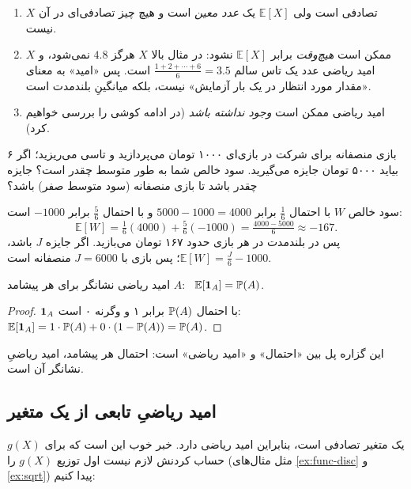 \begin{note}
  \begin{enumerate}
    \item $X$ تصادفی است ولی $\mathbb E[X]$ یک \emph{عدد معین} است و هیچ چیز تصادفی‌ای در آن نیست.
    \item $X$ ممکن است \emph{هیچ‌وقت} برابر $\mathbb E[X]$ نشود: در مثال بالا $X$ هرگز $4.8$ نمی‌شود، و امید ریاضی عدد یک تاس سالم $\frac{1+2+\cdots+6}{6}=3.5$ است. پس «امید» به معنای «مقدار مورد انتظار در یک بار آزمایش» نیست، بلکه میانگینِ بلندمدت است.
    \item امید ریاضی ممکن است \emph{وجود نداشته باشد} (در ادامه کوشی را بررسی خواهیم کرد).
  \end{enumerate}
\end{note}

\begin{example}[label=ex:fair-game]{بازی منصفانه}
  برای شرکت در بازی‌ای ۱۰۰۰ تومان می‌پردازید و تاسی می‌ریزید؛ اگر ۶ بیاید ۵۰۰۰ تومان جایزه می‌گیرید. سود خالص شما به طور متوسط چقدر است؟ جایزه چقدر باشد تا بازی منصفانه (سود متوسط صفر) باشد؟
  \begin{solution}
    سود خالص $W$ با احتمال $\tfrac16$ برابر $5000-1000=4000$ و با احتمال $\tfrac56$ برابر $-1000$ است:
    \[ \mathbb E[W]=\tfrac16(4000)+\tfrac56(-1000)=\tfrac{4000-5000}{6}\approx-167. \]
    پس در بلندمدت در هر بازی حدود ۱۶۷ تومان می‌بازید. اگر جایزه $J$ باشد، $\mathbb E[W]=\frac{J}{6}-1000$؛ پس بازی با $J=6000$ منصفانه است.
  \end{solution}
\end{example}

\begin{proposition}[label=prop:expect-ind]{امید ریاضی نشانگر}
  برای هر پیشامد $A$: \ $\mathbb E[\ind_A]=\P(A)$.
\end{proposition}

\begin{proof}
  $\ind_A$ با احتمال $\P(A)$ برابر ۱ و وگرنه ۰ است: $\mathbb E[\ind_A]=1\cdot\P(A)+0\cdot(1-\P(A))=\P(A)$.
\end{proof}

این گزاره پل بین «احتمال» و «امید ریاضی» است: احتمال هر پیشامد، امید ریاضیِ نشانگر آن است.

\subsection{امید ریاضیِ تابعی از یک متغیر}

$g(X)$ یک متغیر تصادفی است، بنابراین امید ریاضی دارد. خبر خوب این است که برای حساب کردنش لازم نیست اول توزیع $g(X)$ را (مثل مثال‌های \ref{ex:func-disc} و \ref{ex:sqrt}) پیدا کنیم:

